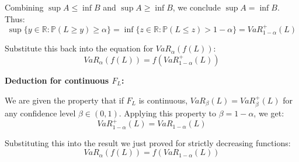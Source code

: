 Combining $\sup A \le \inf B$ and $\sup A \ge \inf B$, we conclude $\sup A = \inf B$. 
Thus:
\begin{equation*}
\sup\{y \in \mathbb{R} : \mathbb{P}(L \ge y) \ge \alpha\} = \inf\{z \in \mathbb{R} : \mathbb{P}(L \le z) > 1 - \alpha\} = VaR_{1-\alpha}^{+}(L)
\end{equation*}

Substitute this back into the equation for $VaR_{\alpha}(f(L))$:
\begin{equation*}
VaR_{\alpha}(f(L)) = f(VaR_{1-\alpha}^{+}(L))
\end{equation*}

\vspace{0.5cm}
\noindent \textbf{Deduction for continuous $F_L$:}

We are given the property that if $F_L$ is continuous, $VaR_{\beta}(L) = VaR_{\beta}^{+}(L)$ for any confidence level $\beta \in (0,1)$.
Applying this property to $\beta = 1 - \alpha$, we get:
\begin{equation*}
VaR_{1-\alpha}^{+}(L) = VaR_{1-\alpha}(L)
\end{equation*}

Substituting this into the result we just proved for strictly decreasing functions:
\begin{equation*}
VaR_{\alpha}(f(L)) = f(VaR_{1-\alpha}(L))
\end{equation*}